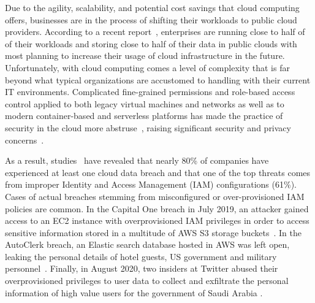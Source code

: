 \noindent Due to the agility, scalability, and potential cost savings that
cloud computing offers, businesses are in the process of shifting their workloads
to public cloud providers. According to a recent report~\cite{Flexera2020}, enterprises are running close to half of of their workloads and storing close to half of their data in public clouds with most planning to increase their usage of cloud infrastructure in the future.
Unfortunately, with cloud computing comes a level of complexity that is far beyond what
typical organizations are accustomed to handling with their current IT environments.
Complicated fine-grained permissions and role-based access control applied to both legacy 
virtual machines and networks as well as to modern container-based and serverless platforms has 
made the practice of security in the cloud more abstruse~\cite{Sharrm}, raising significant
security and privacy concerns~\cite{Takabi2010}.

As a result, studies~\cite{Ermetic2020,IBMSecurity2020} have revealed that nearly 80\% of companies have experienced at least one cloud data breach and that one of the top threats
comes from improper Identity and Access Management (IAM) configurations (61\%).
Cases of actual breaches stemming from misconfigured or over-provisioned IAM
policies are common.
In the Capital One breach in July 2019, an attacker gained access to an EC2 instance with
overprovisioned IAM privileges in order to access sensitive information stored in a multitude
of AWS S3 storage buckets~\cite{Parimi2019}. 
In the AutoClerk breach, an Elastic search database hosted in AWS was left open, leaking
the personal details of hotel guests, US government and military personnel~\cite{Fawkes2020}.
Finally, in August 2020, two insiders at Twitter abused their overprovisioned privileges to
user data to collect and exfiltrate the personal information of high value users for the 
government of Saudi Arabia \cite{Newman2019}.

